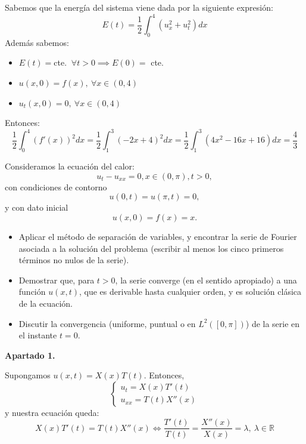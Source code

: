 \documentclass[bibnumbers, palatino]{apuntes}
\begin{document}
\begin{problem}
\begin{itemize}
Sabemos que la energía del sistema viene dada por la siguiente expresión:
$$E(t)=\frac{1}{2}\int^{4}_{0}(u_{x}^2 + u_{t}^2 )dx$$
Además sabemos:
\begin{itemize}
\item $E(t) = $cte. $~\forall t > 0 \implies E(0) =$ cte.
\item $u(x,0) = f(x),~ \forall x\in (0,4)$
\item $u_t(x,0) = 0,~\forall x \in(0,4)$
\end{itemize}
Entonces:
$$\frac{1}{2}\int^{4}_{0}(f'(x))^2dx = \frac{1}{2}\int^{3}_{1}(-2x+4)^2dx = \frac{1}{2}\int^{3}_{1}(4x^2 - 16x +16)dx =  \frac{4}{3}$$
\end{itemize}
\end{problem}

\newpage
\begin{problem}
Consideramos la ecuación del calor:
\[u_t -u_{xx} = 0, x\in(0,\pi), t>0,\]
con condiciones de contorno
\[u(0,t) = u (\pi,t) = 0,\]
y con dato inicial
\[u(x,0) = f(x) = x.\]

\begin{itemize}
\item Aplicar el método de separación de variables, y encontrar la serie de Fourier asociada a la solución del problema (escribir al menos los cinco primeros términos no nulos de la serie).
\item Demostrar que, para $t>0$, la serie converge (en el sentido apropiado) a una función $u(x,t)$, que es derivable hasta cualquier orden, y es solución clásica de la ecuación.
\item Discutir la convergencia (uniforme, puntual o en $L^2([0,\pi])$) de la serie en el instante $t=0$.
\end{itemize}
\solution
\textbf{Apartado 1.}\newline
\end{problem}
Supongamos $u(x,t) = X(x)T(t)$. Entonces, \[\begin{cases}u_{t} = X(x)T'(t)\\u_{xx} = T(t)X''(x)\end{cases}\] y nuestra ecuación queda: \[X(x)T'(t) = T(t)X''(x) \Leftrightarrow \frac{T'(t)}{T(t)} = \frac{X''(x)}{X(x)} = \lambda,~\lambda \in \mathbb{R}\]
\end{document}
